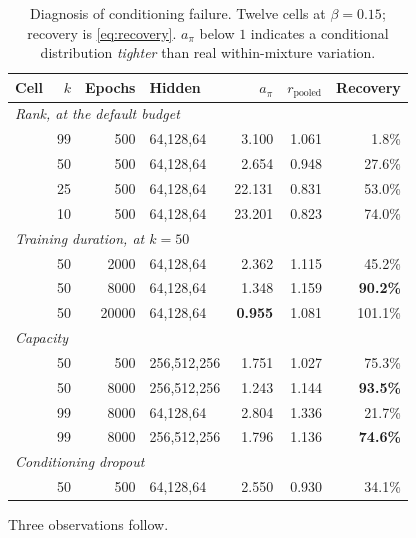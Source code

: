 \begin{table}[t]
\centering
\caption{Diagnosis of conditioning failure. Twelve cells at $\beta = 0.15$;
recovery is \eqref{eq:recovery}. $a_\pi$ below $1$ indicates a conditional
distribution \emph{tighter} than real within-mixture variation.}
\label{tab:diagnosis}
\small
\begin{tabular}{lrrlrrr}
\toprule
Cell & $k$ & Epochs & Hidden & $a_\pi$ & $r_{\mathrm{pooled}}$ & Recovery \\
\midrule
\multicolumn{7}{l}{\emph{Rank, at the default budget}}\\
& 99 & 500 & 64,128,64 & 3.100 & 1.061 & \phantom{0}1.8\% \\
& 50 & 500 & 64,128,64 & 2.654 & 0.948 & 27.6\% \\
& 25 & 500 & 64,128,64 & 22.131 & 0.831 & 53.0\% \\
& 10 & 500 & 64,128,64 & 23.201 & 0.823 & 74.0\% \\
\midrule
\multicolumn{7}{l}{\emph{Training duration, at $k=50$}}\\
& 50 & 2000 & 64,128,64 & 2.362 & 1.115 & 45.2\% \\
& 50 & 8000 & 64,128,64 & 1.348 & 1.159 & \textbf{90.2\%} \\
& 50 & 20000 & 64,128,64 & \textbf{0.955} & 1.081 & 101.1\% \\
\midrule
\multicolumn{7}{l}{\emph{Capacity}}\\
& 50 & 500 & 256,512,256 & 1.751 & 1.027 & 75.3\% \\
& 50 & 8000 & 256,512,256 & 1.243 & 1.144 & \textbf{93.5\%} \\
& 99 & 8000 & 64,128,64 & 2.804 & 1.336 & 21.7\% \\
& 99 & 8000 & 256,512,256 & 1.796 & 1.136 & \textbf{74.6\%} \\
\midrule
\multicolumn{7}{l}{\emph{Conditioning dropout}}\\
& 50 & 500 & 64,128,64 & 2.550 & 0.930 & 34.1\% \\
\bottomrule
\end{tabular}
\end{table}

Three observations follow.

